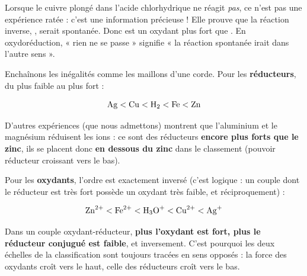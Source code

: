 \documentclass[11pt]{article}
\newcounter{popsec}
\newcounter{popsub}
\newcommand{\courssub}[1]{%
  \stepcounter{popsub}%
  \par\vspace{9pt}\noindent{\popxbold\fontsize{11.5}{13}\selectfont\color{popink}{\color{poporange}\thepopsec.\thepopsub}\hspace{6pt}#1}\par\nopagebreak\vspace{4pt}
}
\begin{document}
\begin{attention}
Lorsque le cuivre plongé dans l'acide chlorhydrique ne réagit \emph{pas}, ce n'est pas une expérience ratée : c'est une information précieuse ! Elle prouve que la réaction inverse, , serait spontanée. Donc  est un oxydant plus fort que . En oxydoréduction, « rien ne se passe » signifie « la réaction spontanée irait dans l'autre sens ».
\end{attention}

\courssub{Le classement obtenu}

Enchaînons les inégalités comme les maillons d'une corde. Pour les \textbf{réducteurs}, du plus faible au plus fort :

\[ \ce{Ag} < \ce{Cu} < \ce{H2} < \ce{Fe} < \ce{Zn} \]

D'autres expériences (que nous admettons) montrent que l'aluminium et le magnésium réduisent les ions  : ce sont des réducteurs \textbf{encore plus forts que le zinc}, ils se placent donc \textbf{en dessous du zinc} dans le classement (pouvoir réducteur croissant vers le bas).

Pour les \textbf{oxydants}, l'ordre est exactement inversé (c'est logique : un couple dont le réducteur est très fort possède un oxydant très faible, et réciproquement) :

\[ \ce{Zn^2+} < \ce{Fe^2+} < \ce{H3O+} < \ce{Cu^2+} < \ce{Ag+} \]

\begin{aretenir}
Dans un couple oxydant-réducteur, \textbf{plus l'oxydant est fort, plus le réducteur conjugué est faible}, et inversement. C'est pourquoi les deux échelles de la classification sont toujours tracées en sens opposés : la force des oxydants croît vers le haut, celle des réducteurs croît vers le bas.
\end{aretenir}
\end{document}
